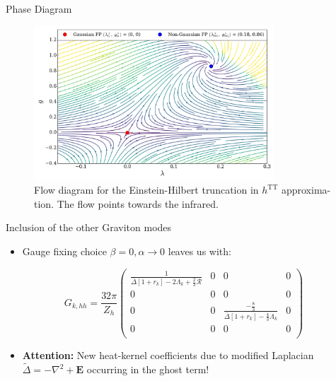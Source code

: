 \documentclass{beamer}
\begin{document}
\begin{frame}{Phase Diagram}
	\begin{figure}
	\centering
	\includegraphics[width=0.8\textwidth]{figures/EH_NoMatter}
	\caption{Flow diagram  for the Einstein-Hilbert truncation in $h^{\mathrm{TT}}$ approxima-\\ \hspace{1.4cm} tion. The flow points towards the infrared.}
\end{figure}
\end{frame}

\begin{frame}{Inclusion of the other Graviton modes}
\begin{itemize}
	\item Gauge fixing choice $\beta=0 , \alpha\rightarrow 0$ leaves us with:
\end{itemize}
\vspace{0.4cm}
\begin{equation} G_{k, h h}= \frac{32\pi}{Z_h}
\begin{pmatrix}
\frac{1}{\bar{\Delta}\left[1+r_{k}\right]-2\Lambda_k+\frac{2}{3}\mathcal{R}} & 0 & 0 & 0 \\[10pt]
0 & 0  & 0 & 0 \\[10pt]
0 & 0 & \frac{-\frac{8}{3}}{\bar{\Delta}\left[1+r_{k}\right]-\frac{4}{3} \Lambda_k}  &0\\[10pt]
0 & 0 & 0 & 0 \\
\end{pmatrix}
\end{equation}
\vspace{0.4cm}
\begin{itemize}
	\item \textbf{Attention:}  New heat-kernel coefficients due to modified Laplacian $\tilde{\Delta} = -\nabla^2 + \mathbf{E}$ occurring in the ghost term!

\end{itemize}
\end{frame}
\end{document}
